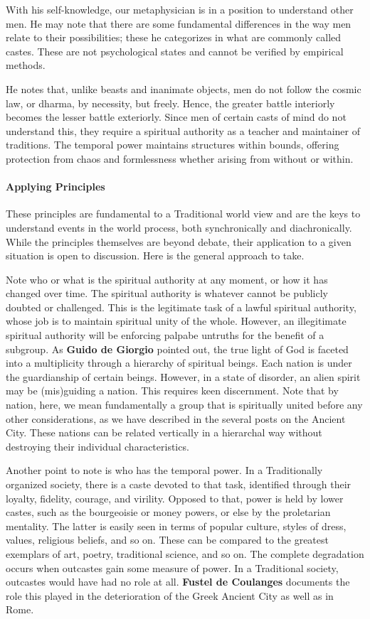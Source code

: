 With his self-knowledge, our metaphysician is in a position to understand other men. He may note that there are some fundamental differences in the way men relate to their possibilities; these he categorizes in what are commonly called castes. These are not psychological states and cannot be verified by empirical methods.

He notes that, unlike beasts and inanimate objects, men do not follow the cosmic law, or dharma, by necessity, but freely. Hence, the greater battle interiorly becomes the lesser battle exteriorly. Since men of certain casts of mind do not understand this, they require a spiritual authority as a teacher and maintainer of traditions. The temporal power maintains structures within bounds, offering protection from chaos and formlessness whether arising from without or within.

\paragraph{Applying Principles}
These principles are fundamental to a Traditional world view and are the keys to understand events in the world process, both synchronically and diachronically. While the principles themselves are beyond debate, their application to a given situation is open to discussion. Here is the general approach to take.



Note who or what is the spiritual authority at any moment, or how it has changed over time. The spiritual authority is whatever cannot be publicly doubted or challenged. This is the legitimate task of a lawful spiritual authority, whose job is to maintain spiritual unity of the whole. However, an illegitimate spiritual authority will be enforcing palpabe untruths for the benefit of a subgroup. As \textbf{Guido de Giorgio} pointed out, the true light of God is faceted into a multiplicity through a hierarchy of spiritual beings. Each nation is under the guardianship of certain beings. However, in a state of disorder, an alien spirit may be (mis)guiding a nation. This requires keen discernment. Note that by nation, here, we mean fundamentally a group that is spiritually united before any other considerations, as we have described in the several posts on the Ancient City. These nations can be related vertically in a hierarchal way without destroying their individual characteristics.

Another point to note is who has the temporal power. In a Traditionally organized society, there is a caste devoted to that task, identified through their loyalty, fidelity, courage, and virility. Opposed to that, power is held by lower castes, such as the bourgeoisie or money powers, or else by the proletarian mentality. The latter is easily seen in terms of popular culture, styles of dress, values, religious beliefs, and so on. These can be compared to the greatest exemplars of art, poetry, traditional science, and so on. The complete degradation occurs when outcastes gain some measure of power. In a Traditional society, outcastes would have had no role at all. \textbf{Fustel de Coulanges} documents the role this played in the deterioration of the Greek Ancient City as well as in Rome.

